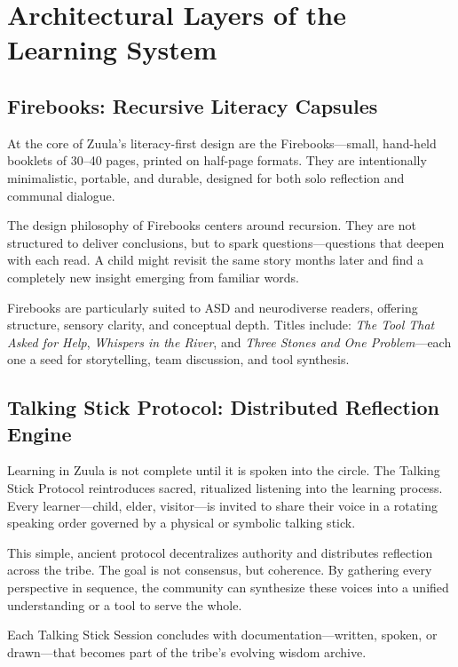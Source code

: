 \documentclass[12pt]{article}
\begin{document}
\section*{Architectural Layers of the Learning System}

\subsection*{Firebooks: Recursive Literacy Capsules}

At the core of Zuula's literacy-first design are the Firebooks—small, hand-held booklets of 30–40 pages, printed on half-page formats. They are intentionally minimalistic, portable, and durable, designed for both solo reflection and communal dialogue.

The design philosophy of Firebooks centers around recursion. They are not structured to deliver conclusions, but to spark questions—questions that deepen with each read. A child might revisit the same story months later and find a completely new insight emerging from familiar words.

Firebooks are particularly suited to ASD and neurodiverse readers, offering structure, sensory clarity, and conceptual depth. Titles include: \textit{The Tool That Asked for Help}, \textit{Whispers in the River}, and \textit{Three Stones and One Problem}—each one a seed for storytelling, team discussion, and tool synthesis.

\subsection*{Talking Stick Protocol: Distributed Reflection Engine}

Learning in Zuula is not complete until it is spoken into the circle. The Talking Stick Protocol reintroduces sacred, ritualized listening into the learning process. Every learner—child, elder, visitor—is invited to share their voice in a rotating speaking order governed by a physical or symbolic talking stick.

This simple, ancient protocol decentralizes authority and distributes reflection across the tribe. The goal is not consensus, but coherence. By gathering every perspective in sequence, the community can synthesize these voices into a unified understanding or a tool to serve the whole.

Each Talking Stick Session concludes with documentation—written, spoken, or drawn—that becomes part of the tribe's evolving wisdom archive.
\end{document}
